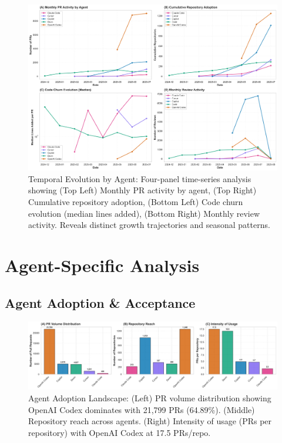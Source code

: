 \documentclass[11pt]{article}
\begin{document}
\begin{figure}[H]
\centering
\includegraphics[width=\textwidth]{figures/fig4_temporal_evolution.png}
\caption{Temporal Evolution by Agent: Four-panel time-series analysis showing (Top Left) Monthly PR activity by agent, (Top Right) Cumulative repository adoption, (Bottom Left) Code churn evolution (median lines added), (Bottom Right) Monthly review activity. Reveals distinct growth trajectories and seasonal patterns.}
\label{fig:temporal_evolution}
\end{figure}

\section{Agent-Specific Analysis}

\subsection{Agent Adoption \& Acceptance}

\begin{figure}[H]
\centering
\includegraphics[width=\textwidth]{figures/fig1_agent_adoption_landscape.png}
\caption{Agent Adoption Landscape: (Left) PR volume distribution showing OpenAI Codex dominates with 21,799 PRs (64.89\%). (Middle) Repository reach across agents. (Right) Intensity of usage (PRs per repository) with OpenAI Codex at 17.5 PRs/repo.}
\label{fig:agent_adoption}
\end{figure}
\end{document}
